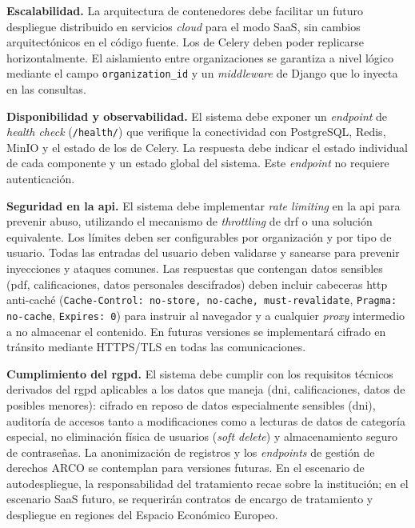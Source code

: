 \item \textbf{Escalabilidad.} \label{rnf:scalability}
La arquitectura de contenedores debe facilitar un futuro despliegue distribuido en servicios
\textit{cloud} para el modo SaaS, sin cambios arquitectónicos en el código fuente. Los
 de Celery deben poder replicarse horizontalmente. El aislamiento entre
organizaciones se garantiza a nivel lógico mediante el campo \texttt{organization\_id} y un
\textit{middleware} de Django que lo inyecta en las consultas.

\item \textbf{Disponibilidad y observabilidad.} \label{rnf:availability}
El sistema debe exponer un \textit{endpoint} de \textit{health check} (\texttt{/health/})
que verifique la conectividad con PostgreSQL, Redis, MinIO y el estado de los
 de Celery. La respuesta debe indicar el estado individual de cada
componente y un estado global del sistema. Este \textit{endpoint} no requiere
autenticación.

\item \textbf{Seguridad en la \acs{api}.} \label{rnf:api_security}
El sistema debe implementar \textit{rate limiting} en la \acs{api} para prevenir abuso,
utilizando el mecanismo de \textit{throttling} de \acs{drf} o una solución equivalente.
Los límites deben ser configurables por organización y por tipo de usuario. Todas las
entradas del usuario deben validarse y sanearse para prevenir inyecciones y ataques
comunes. Las respuestas que contengan datos sensibles (\acs{pdf}, calificaciones, datos
personales descifrados) deben incluir cabeceras \acs{http} anti-caché
(\texttt{Cache-Control: no-store, no-cache, must-revalidate}, \texttt{Pragma: no-cache},
\texttt{Expires: 0}) para instruir al navegador y a cualquier \textit{proxy} intermedio a
no almacenar el contenido. En futuras versiones se implementará cifrado en tránsito
mediante HTTPS/TLS en todas las comunicaciones.

\item \textbf{Cumplimiento del \acs{rgpd}.} \label{rnf:gdpr}
El sistema debe cumplir con los requisitos técnicos derivados del \acs{rgpd} aplicables a
los datos que maneja (\acs{dni}, calificaciones, datos de posibles menores): cifrado en
reposo de datos especialmente sensibles (\acs{dni}), auditoría de accesos tanto a
modificaciones como a lecturas de datos de categoría especial, no eliminación física de
usuarios (\textit{soft delete}) y almacenamiento seguro de contraseñas. La anonimización
de registros y los \textit{endpoints} de gestión de derechos ARCO se contemplan para
versiones futuras. En el escenario de autodespliegue, la responsabilidad del tratamiento
recae sobre la institución; en el escenario SaaS futuro, se requerirán contratos de encargo
de tratamiento y despliegue en regiones del Espacio Económico Europeo.

